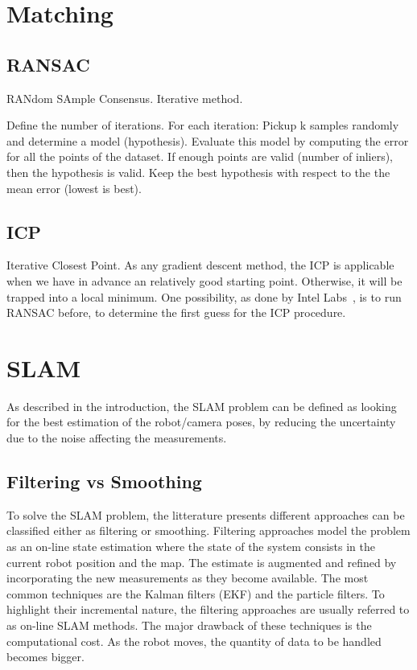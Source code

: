 \documentclass[a4paper,11pt]{kth-mag}
\begin{document}
\section{Matching}

\subsection{RANSAC}
RANdom SAmple Consensus. Iterative method.

Define the number of iterations.
For each iteration:
Pickup k samples randomly and determine a model (hypothesis). Evaluate this model by computing the error for all the points of the dataset. If enough points are valid (number of inliers), then the hypothesis is valid. Keep the best hypothesis with respect to the the mean error (lowest is best).

\subsection{ICP}
Iterative Closest Point. As any gradient descent method, the ICP is applicable when we have in advance an relatively good starting point. Otherwise, it will be trapped into a local minimum. One possibility, as done by Intel Labs~\cite{IntelRGBD2010}, is to run RANSAC before, to determine the first guess for the ICP procedure.

\section{SLAM}

As described in the introduction, the SLAM problem can be defined as looking for the best estimation of the robot/camera poses, by reducing the uncertainty due to the noise affecting the measurements.

\subsection{Filtering vs Smoothing}

To solve the SLAM problem, the litterature presents different approaches can be classified either as filtering or smoothing. Filtering approaches model the problem as an on-line state estimation where the state of the system consists in the current robot position and the map. The estimate is augmented and refined by incorporating the new measurements as they become available.
The most common techniques are the Kalman filters (EKF) and the particle filters. To highlight their incremental nature, the filtering approaches are usually referred to as on-line SLAM methods.
The major drawback of these techniques is the computational cost. As the robot moves, the quantity of data to be handled becomes bigger.
\end{document}
